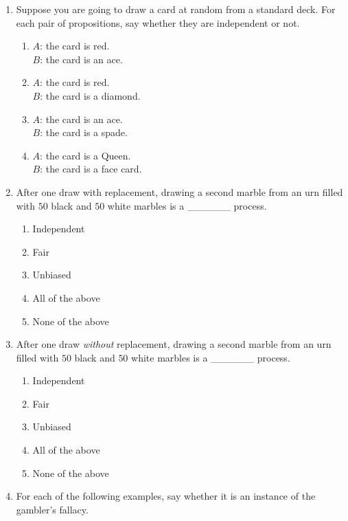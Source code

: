 \documentclass[justified]{tufte-book}
\providecommand{\tightlist}{%
  \setlength{\itemsep}{0pt}\setlength{\parskip}{0pt}}
\theoremstyle{definition}
\theoremstyle{definition}
\theoremstyle{definition}
\theoremstyle{remark}
\begin{document}
\begin{enumerate}
\item
  Suppose you are going to draw a card at random from a standard deck. For each pair of propositions, say whether they are independent or not.

  \begin{enumerate}
  \def\labelenumii{\alph{enumii}.}
  \item
    \(A\): the card is red.\\
    \(B\): the card is an ace.
  \item
    \(A\): the card is red.\\
    \(B\): the card is a diamond.
  \item
    \(A\): the card is an ace.\\
    \(B\): the card is a spade.
  \item
    \(A\): the card is a Queen.\\
    \(B\): the card is a face card.
  \end{enumerate}
\item
  After one draw with replacement, drawing a second marble from an urn filled with \(50\) black and \(50\) white marbles is a \_\_\_\_\_\_ process.

  \begin{enumerate}
  \def\labelenumii{\alph{enumii}.}
  \tightlist
  \item
    Independent
  \item
    Fair
  \item
    Unbiased
  \item
    All of the above
  \item
    None of the above
  \end{enumerate}
\item
  After one draw \emph{without} replacement, drawing a second marble from an urn filled with \(50\) black and \(50\) white marbles is a \_\_\_\_\_\_ process.

  \begin{enumerate}
  \def\labelenumii{\alph{enumii}.}
  \tightlist
  \item
    Independent
  \item
    Fair
  \item
    Unbiased
  \item
    All of the above
  \item
    None of the above
  \end{enumerate}
\item
  For each of the following examples, say whether it is an instance of the gambler's fallacy.


\end{enumerate}
\end{document}
